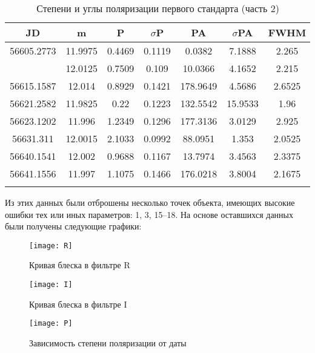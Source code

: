\newpage

\begin{table}[h]
  \centering
  \caption{Степени и углы поляризации первого стандарта (часть 2)}
  \begin{tabular}{ccccccc}
    \toprule
    JD &
    m &
    P &
    $\sigma$P &
    PA &
    $\sigma$PA &
    FWHM \\
    \midrule
    56605.2773 & 11.9975 & 0.4469 & 0.1119 & 0.0382 & 7.1888 & 2.265 \\
    \arrayrulecolor{black!40}
    \midrule
    56608.16 & 12.0125 & 0.7509 & 0.109 & 10.0366 & 4.1652 & 2.215 \\
    \midrule
    56615.1587 & 12.014 & 0.8929 & 0.1421 & 178.9649 & 4.5686 & 2.6525 \\
    \midrule
    56621.2582 & 11.9825 & 0.22 & 0.1223 & 132.5542 & 15.9533 & 1.96 \\
    \midrule
    56623.1202 & 11.996 & 1.2349 & 0.1296 & 177.3136 & 3.0129 & 2.925 \\
    \midrule
    56631.311 & 12.0015 & 2.1033 & 0.0992 & 88.0951 & 1.353 & 2.0525 \\
    \midrule
    56640.1541 & 12.002 & 0.9688 & 0.1167 & 13.7974 & 3.4563 & 2.3375 \\
    \midrule
    56641.1556 & 11.997 & 1.1075 & 0.1466 & 176.0218 & 3.8004 & 2.1675 \\
    \arrayrulecolor{black}
    \bottomrule
  \end{tabular}
\end{table}

Из этих данных были отброшены несколько точек объекта, имеющих высокие ошибки тех или иных параметров: 1, 3, 15--18. На основе оставшихся данных были получены следующие графики:

\begin{figure}[h]
  \centering
  \texttt{[image: R]}
  \caption{Кривая блеска в фильтре R}
\end{figure}

\newpage

\begin{figure}[h!]
  \centering
  \texttt{[image: I]}
  \caption{Кривая блеска в фильтре I}
\end{figure}

\begin{figure}[h!]
  \centering
  \texttt{[image: P]}
  \caption{Зависимость степени поляризации от даты}
\end{figure}

